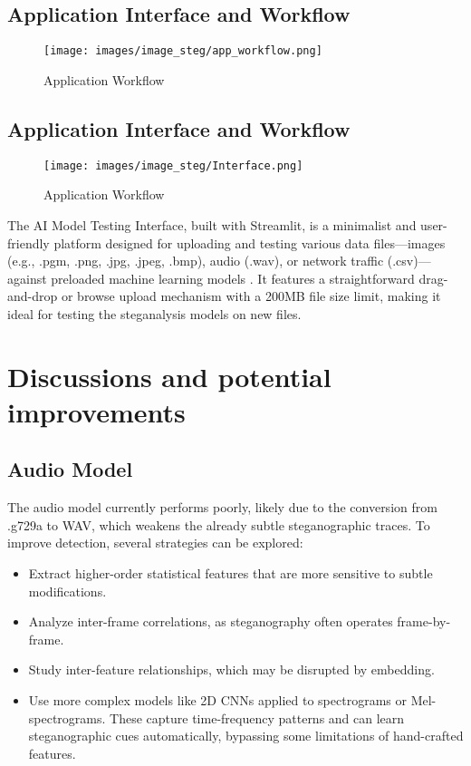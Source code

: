 \documentclass[12pt]{article}
\begin{document}
\subsection{Application Interface and Workflow}
\begin{figure}[H]
    \centering
    \texttt{[image: images/image\_steg/app\_workflow.png]}
    \caption{Application Workflow }
\end{figure}

\subsection{Application Interface and Workflow}
\begin{figure}[H]
    \centering
    \texttt{[image: images/image\_steg/Interface.png]}
    \caption{Application Workflow }
\end{figure}
The AI Model Testing Interface, built with Streamlit, is a minimalist and user-friendly platform designed for uploading and testing various data files—images (e.g., .pgm, .png, .jpg, .jpeg, .bmp), audio (.wav), or network traffic (.csv)—against preloaded machine learning models . It features a straightforward drag-and-drop or browse upload mechanism with a 200MB file size limit, making it ideal for testing the steganalysis models on new files.
\newpage

\section{Discussions and potential improvements}
\subsection{Audio Model}
The audio model currently performs poorly, likely due to the conversion from .g729a to WAV, which weakens the already subtle steganographic traces. To improve detection, several strategies can be explored:

\begin{itemize}
    \item Extract higher-order statistical features that are more sensitive to subtle modifications.
    \item Analyze inter-frame correlations, as steganography often operates frame-by-frame.
    \item Study inter-feature relationships, which may be disrupted by embedding.
    \item Use more complex models like 2D CNNs applied to spectrograms or Mel-spectrograms. These capture time-frequency patterns and can learn steganographic cues automatically, bypassing some limitations of hand-crafted features.
\end{itemize}
\end{document}
